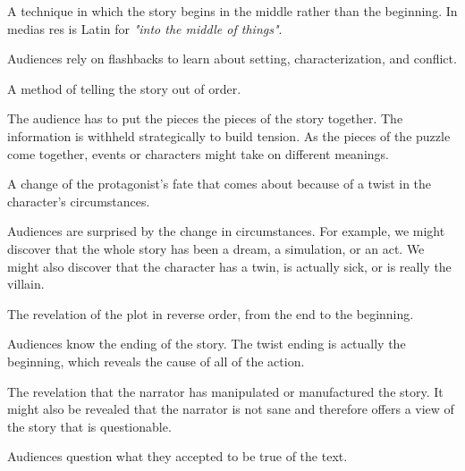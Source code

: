 \begin{definition}
  \label{def:in_medias_res}

  A technique in which the story begins in the middle rather than the beginning.
  In medias res is Latin for \textit{"into the middle of things"}.

  Audiences rely on flashbacks to learn about setting, characterization, and
  conflict.
\end{definition}

\begin{definition}
  \label{def:nonlinear_narration}

  A method of telling the story out of order.

  The audience has to put the pieces the pieces of the story together. The
  information is withheld strategically to build tension. As the pieces of the
  puzzle come together, events or characters might take on different meanings.
\end{definition}

\begin{definition}[Reversal]
  \label{def:reversal}

  A change of the protagonist's fate that comes about because of a twist in the
  character's circumstances.

  Audiences are surprised by the change in circumstances. For example, we might
  discover that the whole story has been a dream, a simulation, or an act. We
  might also discover that the character has a twin, is actually sick, or is
  really the villain.
\end{definition}

\begin{definition}
  \label{def:reverse_chronology}

  The revelation of the plot in reverse order, from the end to the beginning.

  Audiences know the ending of the story. The twist ending is actually the
  beginning, which reveals the cause of all of the action.
\end{definition}

\begin{definition}
  \label{def:unreliable_narrator}

  The revelation that the narrator has manipulated or manufactured the story. It
  might also be revealed that the narrator is not sane and therefore offers a
  view of the story that is questionable.

  Audiences question what they accepted to be true of the text.
\end{definition}


\newpage
